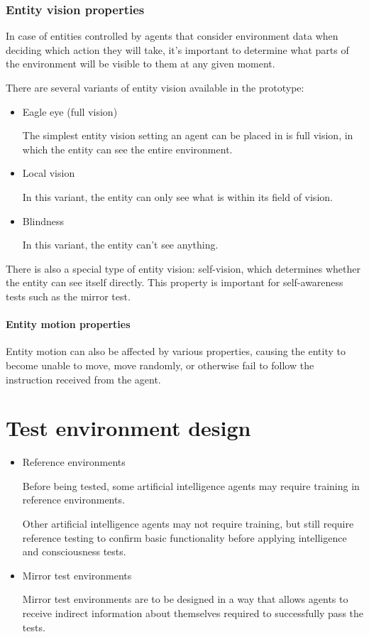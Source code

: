 \documentclass[masterthesis]{fer}
\begin{document}
\subsubsection{Entity vision properties}

In case of entities controlled by agents that consider environment data
when deciding which action they will take, it's important to determine what parts of the environment will be visible to them at any given moment.

There are several variants of entity vision available in the prototype:

\begin{itemize}
\item{Eagle eye (full vision)}

The simplest entity vision setting an agent can be placed in is full vision, in which the entity can see the entire environment.

\item{Local vision}

In this variant, the entity can only see what is within its field of vision.

\item{Blindness}

In this variant, the entity can't see anything.

\end{itemize}

There is also a special type of entity vision: self-vision, which determines whether the entity can see itself directly.
This property is important for self-awareness tests such as the mirror test.

\paragraph{Entity motion properties}

Entity motion can also be affected by various properties,
causing the entity to become unable to move, move randomly, or
otherwise fail to follow the instruction received from the agent.

\section{Test environment design}
\begin{itemize}

\item Reference environments

Before being tested, some artificial intelligence agents may require training in reference environments.

Other artificial intelligence agents may not require training, but still require reference testing to confirm basic functionality before applying intelligence and consciousness tests.

\item Mirror test environments

Mirror test environments are to be designed in a way that allows agents to receive indirect information about themselves required to successfully pass the tests.

\end{itemize}
\end{document}
